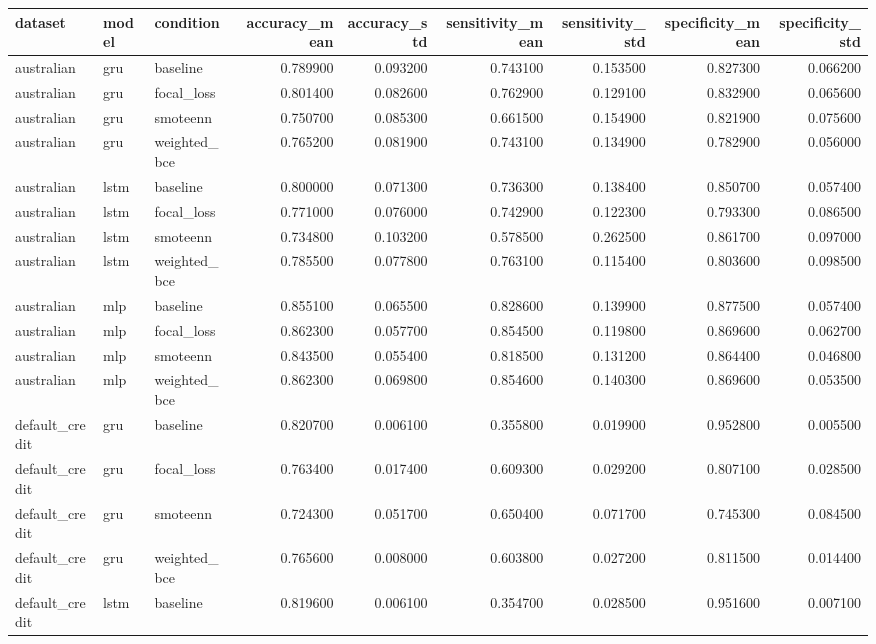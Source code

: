 \begin{tabular}{lllrrrrrr}
\toprule
dataset & model & condition & accuracy_mean & accuracy_std & sensitivity_mean & sensitivity_std & specificity_mean & specificity_std \\
\midrule
australian & gru & baseline & 0.789900 & 0.093200 & 0.743100 & 0.153500 & 0.827300 & 0.066200 \\
australian & gru & focal_loss & 0.801400 & 0.082600 & 0.762900 & 0.129100 & 0.832900 & 0.065600 \\
australian & gru & smoteenn & 0.750700 & 0.085300 & 0.661500 & 0.154900 & 0.821900 & 0.075600 \\
australian & gru & weighted_bce & 0.765200 & 0.081900 & 0.743100 & 0.134900 & 0.782900 & 0.056000 \\
australian & lstm & baseline & 0.800000 & 0.071300 & 0.736300 & 0.138400 & 0.850700 & 0.057400 \\
australian & lstm & focal_loss & 0.771000 & 0.076000 & 0.742900 & 0.122300 & 0.793300 & 0.086500 \\
australian & lstm & smoteenn & 0.734800 & 0.103200 & 0.578500 & 0.262500 & 0.861700 & 0.097000 \\
australian & lstm & weighted_bce & 0.785500 & 0.077800 & 0.763100 & 0.115400 & 0.803600 & 0.098500 \\
australian & mlp & baseline & 0.855100 & 0.065500 & 0.828600 & 0.139900 & 0.877500 & 0.057400 \\
australian & mlp & focal_loss & 0.862300 & 0.057700 & 0.854500 & 0.119800 & 0.869600 & 0.062700 \\
australian & mlp & smoteenn & 0.843500 & 0.055400 & 0.818500 & 0.131200 & 0.864400 & 0.046800 \\
australian & mlp & weighted_bce & 0.862300 & 0.069800 & 0.854600 & 0.140300 & 0.869600 & 0.053500 \\
default_credit & gru & baseline & 0.820700 & 0.006100 & 0.355800 & 0.019900 & 0.952800 & 0.005500 \\
default_credit & gru & focal_loss & 0.763400 & 0.017400 & 0.609300 & 0.029200 & 0.807100 & 0.028500 \\
default_credit & gru & smoteenn & 0.724300 & 0.051700 & 0.650400 & 0.071700 & 0.745300 & 0.084500 \\
default_credit & gru & weighted_bce & 0.765600 & 0.008000 & 0.603800 & 0.027200 & 0.811500 & 0.014400 \\
default_credit & lstm & baseline & 0.819600 & 0.006100 & 0.354700 & 0.028500 & 0.951600 & 0.007100 \\

\end{tabular}
